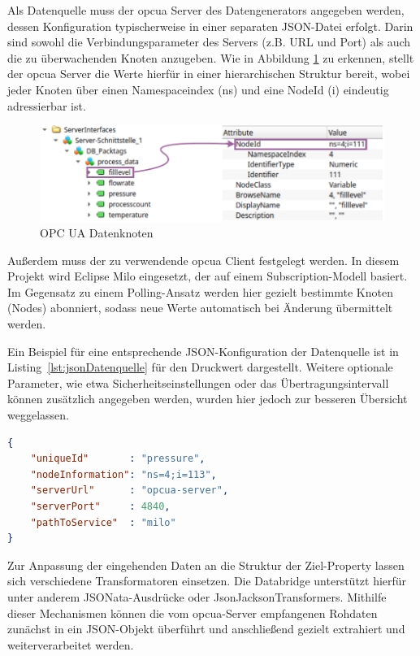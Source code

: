 Als Datenquelle muss der \acs{opcua} Server des Datengenerators angegeben werden, dessen Konfiguration typischerweise in einer separaten JSON-Datei erfolgt.
Darin sind sowohl die Verbindungsparameter des Servers (z.B. URL und Port) als auch die zu überwachenden Knoten anzugeben.
Wie in Abbildung \ref{fig:OPCUADatenStruktur} zu erkennen, stellt der \acs{opcua} Server die Werte hierfür in einer hierarchischen Struktur bereit, wobei jeder Knoten über einen Namespaceindex (ns) und eine NodeId (i) eindeutig adressierbar ist.

\begin{figure}[htbp]
    \centering
    \includegraphics{Bilder/OPCUA/OPCUADaten.pdf}
    \caption{OPC UA Datenknoten}
    \label{fig:OPCUADatenStruktur}
\end{figure}

Außerdem muss der zu verwendende \acs{opcua} Client festgelegt werden.
In diesem Projekt wird Eclipse Milo eingesetzt, der auf einem Subscription-Modell basiert.
Im Gegensatz zu einem Polling-Ansatz werden hier gezielt bestimmte Knoten (Nodes) abonniert, sodass neue Werte automatisch bei Änderung übermittelt werden.

Ein Beispiel für eine entsprechende JSON-Konfiguration der Datenquelle ist in Listing~\ref{lst:jsonDatenquelle} für den Druckwert dargestellt.
Weitere optionale Parameter, wie etwa Sicherheitseinstellungen oder das Übertragungsintervall können zusätzlich angegeben werden, wurden hier jedoch zur besseren Übersicht weggelassen.

\begin{lstlisting}[language=json, caption={Beispielhafte JSON-Konfiguration einer Datenquelle}, label={lst:jsonDatenquelle}]
{
    "uniqueId"       : "pressure",
    "nodeInformation": "ns=4;i=113",
    "serverUrl"      : "opcua-server",
    "serverPort"     : 4840,
    "pathToService"  : "milo"
}
\end{lstlisting}

Zur Anpassung der eingehenden Daten an die Struktur der Ziel-Property lassen sich verschiedene Transformatoren einsetzen.
Die Databridge unterstützt hierfür unter anderem JSONata-Ausdrücke oder JsonJacksonTransformers.
Mithilfe dieser Mechanismen können die vom \acs{opcua}-Server empfangenen Rohdaten zunächst in ein JSON-Objekt überführt und anschließend gezielt extrahiert und weiterverarbeitet werden.

